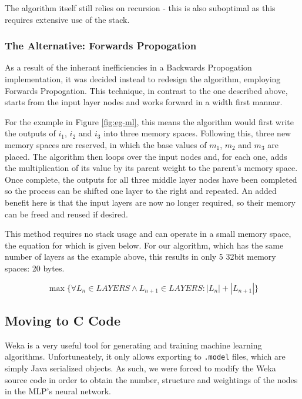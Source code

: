 The algorithm itself still relies on recursion - this is also suboptimal as this requires extensive use of the stack.

\subsubsection{The Alternative: Forwards Propogation}

As a result of the inherant inefficiencies in a Backwards Propogation implementation, it was decided instead to redesign the algorithm, employing Forwards Propogation. This technique, in contrast to the one described above, starts from the input layer nodes and works forward in a width first mannar.

For the example in Figure \ref{fig:eg-ml}, this means the algorithm would first write the outputs of $i_1$, $i_2$ and $i_3$ into three memory spaces. Following this, three new memory spaces are reserved, in which the base values of $m_1$, $m_2$ and $m_3$ are placed. The algorithm then loops over the input nodes and, for each one, adds the multiplication of its value by its parent weight to the parent's memory space. Once complete, the outputs for all three middle layer nodes have been completed so the process can be shifted one layer to the right and repeated. An added benefit here is that the input layers are now no longer required, so their memory can be freed and reused if desired.

This method requires no stack usage and can operate in a small memory space, the equation for which is given below. For our algorithm, which has the same number of layers as the example above, this results in only 5 32bit memory spaces: 20 bytes.

\begin{equation}
\label{eq:algo-size}
\max\{\forall L_n \in LAYERS \wedge L_{n+1} \in LAYERS : |L_n|+|L_{n+1}|\}
\end{equation}

\subsection{Moving to C Code}

Weka is a very useful tool for generating and training machine learning algorithms. Unfortuneately, it only allows exporting to \verb|.model| files, which are simply Java serialized objects. As such, we were forced to modify the Weka source code in order to obtain the number, structure and weightings of the nodes in the MLP's neural network.

